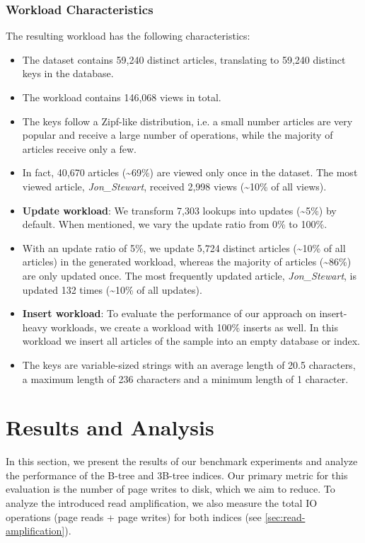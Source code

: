 \subsubsection*{Workload Characteristics}
\label{sec:workload-characteristics}
The resulting workload has the following characteristics:
\begin{itemize}
    \item The dataset contains 59,240 distinct articles, translating to 59,240 distinct keys in the database.
    \item The workload contains 146,068 views in total.
    \item The keys follow a Zipf-like distribution, i.e. a small number articles are very popular and receive a large number of operations, while the majority of articles receive only a few. 
    \item In fact, 40,670 articles (\textasciitilde69\%) are viewed only once in the dataset. 
    The most viewed article, \textit{Jon\_Stewart}, received 2,998 views (\textasciitilde10\% of all views).
    \item \textbf{Update workload}: We transform 7,303 lookups into updates (\textasciitilde5\%) by default. When mentioned, we vary the update ratio from 0\% to 100\%.
    \item With an update ratio of 5\%, we update 5,724 distinct articles (\textasciitilde10\% of all articles) in the generated workload, whereas the majority of articles (\textasciitilde86\%) are only updated once.
    The most frequently updated article, \textit{Jon\_Stewart}, is updated 132 times (\textasciitilde10\% of all updates).
    \item \textbf{Insert workload}: To evaluate the performance of our approach on insert-heavy workloads, we create a workload with 100\% inserts as well.
    In this workload we insert all articles of the sample into an empty database or index.
    \item The keys are variable-sized strings with an average length of 20.5 characters, a maximum length of 236 characters and a minimum length of 1 character.
\end{itemize}

\section{Results and Analysis}
\label{sec:results-analysis}
In this section, we present the results of our benchmark experiments and analyze the performance of the B-tree and 3B-tree indices.
Our primary metric for this evaluation is the number of page writes to disk, which we aim to reduce.
To analyze the introduced read amplification, we also measure the total \ac{IO} operations (page reads + page writes) for both indices (see \autoref{sec:read-amplification}).

